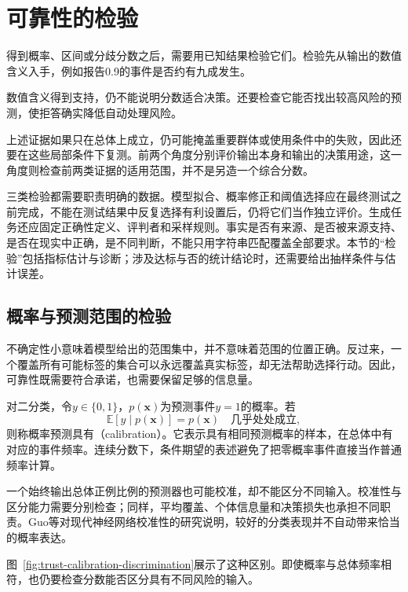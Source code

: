 \section{可靠性的检验}
\label{sec:reliability-evaluation}

得到概率、区间或分歧分数之后，需要用已知结果检验它们。检验先从输出的数值含义入手，例如报告0.9的事件是否约有九成发生。

数值含义得到支持，仍不能说明分数适合决策。还要检查它能否找出较高风险的预测，使拒答确实降低自动处理风险。

上述证据如果只在总体上成立，仍可能掩盖重要群体或使用条件中的失败，因此还要在这些局部条件下复测。前两个角度分别评价输出本身和输出的决策用途，这一角度则检查前两类证据的适用范围，并不是另造一个综合分数。

三类检验都需要职责明确的数据。模型拟合、概率修正和阈值选择应在最终测试之前完成，不能在测试结果中反复选择有利设置后，仍将它们当作独立评价。生成任务还应固定正确性定义、评判者和采样规则。事实是否有来源、是否被来源支持、是否在现实中正确，是不同判断，不能只用字符串匹配覆盖全部要求。本节的“检验”包括指标估计与诊断；涉及达标与否的统计结论时，还需要给出抽样条件与估计误差。

\subsection{概率与预测范围的检验}
\label{sec:reliability-output-evaluation}

不确定性小意味着模型给出的范围集中，并不意味着范围的位置正确。反过来，一个覆盖所有可能标签的集合可以永远覆盖真实标签，却无法帮助选择行动。因此，可靠性既需要符合承诺，也需要保留足够的信息量。

对二分类，令$y\in\{0,1\}$，$p(\bm{x})$为预测事件$y=1$的概率。若
\begin{equation}
 \mathbb E[y\mid p(\bm{x})]=p(\bm{x})
 \quad\text{几乎处处成立},
 \label{eq:reliability-calibration}
\end{equation}
则称概率预测具有（calibration）。它表示具有相同预测概率的样本，在总体中有对应的事件频率。连续分数下，条件期望的表述避免了把零概率事件直接当作普通频率计算。

一个始终输出总体正例比例的预测器也可能校准，却不能区分不同输入。校准性与区分能力需要分别检查；同样，平均覆盖、个体信息量和决策损失也承担不同职责。Guo等对现代神经网络校准性的研究说明，较好的分类表现并不自动带来恰当的概率表达。

图~\ref{fig:trust-calibration-discrimination}展示了这种区别。即使概率与总体频率相符，也仍要检查分数能否区分具有不同风险的输入。


